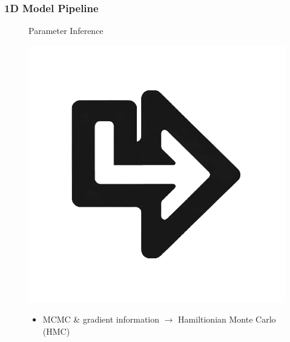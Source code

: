 \documentclass{beamer}
\begin{document}
\begin{frame}
	\frametitle{1D Model Pipeline}
	\vspace{-16pt}
	\begin{figure}[htbp]
		\begin{minipage}[t][0.06\paperheight][t]{\linewidth}
			\begin{minipage}{0.1\linewidth}
				\caption*{\tiny}
			\end{minipage}
			\begin{minipage}{0.58\linewidth}
				\caption*{\tiny Parameter Inference}
			\end{minipage}
			\begin{minipage}{0.1\linewidth}
				\caption*{\tiny }
			\end{minipage}
		\end{minipage}
		\begin{minipage}[c][0.35\paperheight][c]{\linewidth}
			\begin{minipage}{0.1\linewidth}
				\includegraphics[angle=270, width=\linewidth]{images/left_turn_arrow.eps}
			\end{minipage}
			\begin{minipage}{0.58\linewidth}
				{\footnotesize \begin{itemize} 
					\item MCMC \& gradient information $\rightarrow$ Hamiltionian Monte Carlo (HMC)

\end{itemize}}
\end{minipage}
\end{minipage}
\end{figure}
\end{frame}
\end{document}
